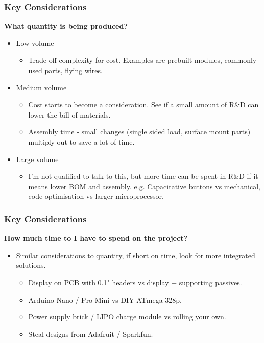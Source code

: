 \documentclass[t]{beamer}
\begin{document}

\begin{frame}
\frametitle{Key Considerations}
\large{\textbf{What quantity is being produced?}}
\vspace{1mm}
\begin{itemize}
	\item Low volume 
	\begin{itemize}
		\item Trade off complexity for cost. Examples are prebuilt modules, commonly used parts, flying wires.
	\end{itemize} 
	\item Medium volume
	\begin{itemize}
		\item Cost starts to become a consideration. See if a small amount of R\&D can lower the bill of materials.
		\item Assembly time - small changes (single sided load, surface mount parts) multiply out to save a lot of time.
	\end{itemize}
	\item Large volume
	\begin{itemize}
		\item I'm not qualified to talk to this, but more time can be spent in R\&D if it means lower BOM and assembly. e.g. Capacitative buttons vs mechanical, code optimisation vs larger microprocessor. 
	\end{itemize}
\end{itemize}
\end{frame}


\begin{frame}
\frametitle{Key Considerations}
\large{\textbf{How much time to I have to spend on the project?}}
\vspace{1mm}

\begin{itemize}
	\item Similar considerations to quantity, if short on time, look for more integrated solutions. 
	\begin{itemize}
		\item Display on PCB with 0.1" headers vs display + supporting passives.  
		\item Arduino Nano / Pro Mini vs DIY ATmega 328p.
		\item Power supply brick / LIPO charge module vs rolling your own. 
		\item Steal designs from Adafruit / Sparkfun. 
	\end{itemize}
\end{itemize}
\end{frame}
\end{document}
